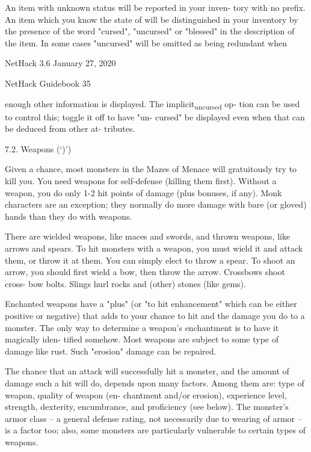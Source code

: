 \documentclass[11pt]{article}
\begin{document}
   An item with unknown status will be reported in your inven-
tory with no prefix. An item which you know the state of will be
distinguished in your inventory by the presence of the word
"cursed", "uncursed" or "blessed" in the description of the item.
In some cases "uncursed" will be omitted as being redundant when


NetHack 3.6                   January 27, 2020





NetHack Guidebook                       35



enough other information is displayed. The implicit\textsubscript{uncursed} op-
tion can be used to control this; toggle it off to have "un-
cursed" be displayed even when that can be deduced from other at-
tributes.

7.2. Weapons (`)')

   Given a chance, most monsters in the Mazes of Menace will
gratuitously try to kill you. You need weapons for self-defense
(killing them first).  Without a weapon, you do only 1-2 hit
points of damage (plus bonuses, if any). Monk characters are an
exception; they normally do more damage with bare (or gloved)
hands than they do with weapons.

   There are wielded weapons, like maces and swords, and thrown
weapons, like arrows and spears. To hit monsters with a weapon,
you must wield it and attack them, or throw it at them. You can
simply elect to throw a spear. To shoot an arrow, you should
first wield a bow, then throw the arrow. Crossbows shoot cross-
bow bolts. Slings hurl rocks and (other) stones (like gems).

   Enchanted weapons have a "plus" (or "to hit enhancement"
which can be either positive or negative) that adds to your
chance to hit and the damage you do to a monster. The only way
to determine a weapon's enchantment is to have it magically iden-
tified somehow. Most weapons are subject to some type of damage
like rust. Such "erosion" damage can be repaired.

   The chance that an attack will successfully hit a monster,
and the amount of damage such a hit will do, depends upon many
factors. Among them are: type of weapon, quality of weapon (en-
chantment and/or erosion), experience level, strength, dexterity,
encumbrance, and proficiency (see below).  The monster's armor
class -- a general defense rating, not necessarily due to wearing
of armor -- is a factor too; also, some monsters are particularly
vulnerable to certain types of weapons.
\end{document}
